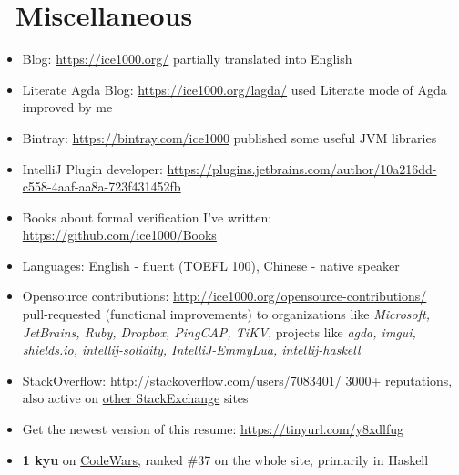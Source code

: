 \documentclass{resume}
\begin{document}

\section{\faInfo\ Miscellaneous}
\begin{itemize}[parsep=0.25ex]
  \item Blog: \url{https://ice1000.org/} partially translated into English
  \item Literate Agda Blog: \url{https://ice1000.org/lagda/} used Literate mode of Agda improved by me
  \item Bintray: \url{https://bintray.com/ice1000} published some useful JVM libraries
  \item IntelliJ Plugin developer: \url{https://plugins.jetbrains.com/author/10a216dd-c558-4aaf-aa8a-723f431452fb}
  \item Books about formal verification I've written: \url{https://github.com/ice1000/Books}
  \item Languages: English - fluent (TOEFL 100), Chinese - native speaker
  \item Opensource contributions: \url{http://ice1000.org/opensource-contributions/} \\
    pull-requested (functional improvements) to organizations like \textit{Microsoft, JetBrains, Ruby, Dropbox, PingCAP, TiKV},
    projects like \textit{agda, imgui, shields.io, intellij-solidity, IntelliJ-EmmyLua, intellij-haskell}
  \item StackOverflow: \url{http://stackoverflow.com/users/7083401/}
    3000+ reputations, also active on \href{https://stackexchange.com/users/9532102/} {other StackExchange} sites
  \item Get the newest version of this resume: \url{https://tinyurl.com/y8xdlfug}
  \item \textbf{1 kyu} on
    \href{https://www.codewars.com/users/ice1000} {CodeWars},
    ranked \#37 on the whole site, primarily in Haskell
\end{itemize}

%
%
\end{document}

